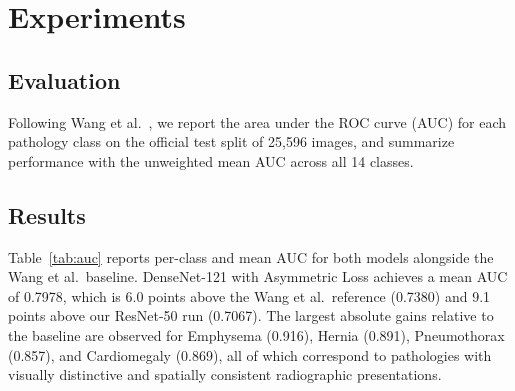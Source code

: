 \documentclass[runningheads]{llncs}
\begin{document}
\section{Experiments}
\label{sec:experiments}

\subsection{Evaluation}
Following Wang et al.~\cite{wang2017chestxray14}, we report the
area under the ROC curve (AUC) for each pathology class on the
official test split of 25,596 images, and summarize performance
with the unweighted mean AUC across all 14 classes.

\subsection{Results}

Table~\ref{tab:auc} reports per-class and mean AUC for both
models alongside the Wang et al.\ baseline. DenseNet-121 with
Asymmetric Loss achieves a mean AUC of 0.7978, which is 6.0
points above the Wang et al.\ reference (0.7380) and 9.1 points
above our ResNet-50 run (0.7067). The largest absolute gains
relative to the baseline are observed for Emphysema (0.916),
Hernia (0.891), Pneumothorax (0.857), and Cardiomegaly (0.869),
all of which correspond to pathologies with visually distinctive
and spatially consistent radiographic presentations.
\end{document}
